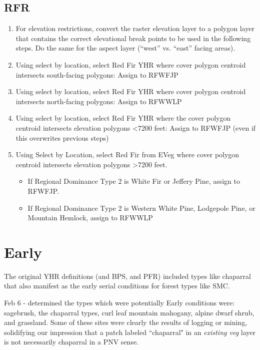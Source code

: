 \subsection{RFR}
\begin{enumerate}
\item For elevation restrictions, convert the raster elevation layer to a polygon layer that contains the correct elevational break points to be used in the following steps. Do the same for the aspect layer (``west'' vs. ``east'' facing areas).
\item Using select by location, select Red Fir YHR where cover polygon centroid intersects south-facing polygons: Assign to RFWFJP
\item Using select by location, select Red Fir YHR where cover polygon centroid intersects north-facing polygons: Assign to RFWWLP
\item Using select by location, select Red Fir YHR where the cover polygon centroid intersects elevation polygons \textless 7200 feet: Assign to RFWFJP (even if this overwrites previous steps)
\item Using Select by Location, select Red Fir from EVeg where cover polygon centroid intersects elevation polygons \textgreater7200 feet.
	\begin{itemize} 
	\item If Regional Dominance Type 2 is White Fir or Jeffery Pine, assign to RFWFJP.
	\item If Regional Dominance Type 2 is Western White Pine, Lodgepole Pine, or Mountain Hemlock, assign to RFWWLP
	\end{itemize}
\end{enumerate}

\section{Early}
The original YHR definitions (and BPS, and PFR) included types like chaparral that also manifest as the early serial conditions for forest types like SMC.

Feb 6 - determined the types which were potentially Early conditions were: sagebrush, the chaparral types, curl leaf mountain mahogany, alpine dwarf shrub, and grassland. Some of these sites were clearly the results of logging or mining, solidifying our impression that a patch labeled ``chaparral" in an \emph{existing veg} layer is not necessarily chaparral in a PNV sense. 

